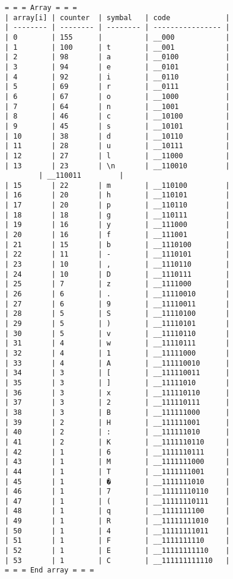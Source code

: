 \begin{lstlisting}[language=Out,]
= = = Array = = =
| array[i] | counter  | symbal   | code             |
| -------- | -------- | -------- | ---------------- |
| 0        | 155      |          | __000            |
| 1        | 100      | t        | __001            |
| 2        | 98       | a        | __0100           |
| 3        | 94       | e        | __0101           |
| 4        | 92       | i        | __0110           |
| 5        | 69       | r        | __0111           |
| 6        | 67       | o        | __1000           |
| 7        | 64       | n        | __1001           |
| 8        | 46       | c        | __10100          |
| 9        | 45       | s        | __10101          |
| 10       | 38       | d        | __10110          |
| 11       | 28       | u        | __10111          |
| 12       | 27       | l        | __11000          |
| 13       | 23       | \n       | __110010         |
        | __110011         |
| 15       | 22       | m        | __110100         |
| 16       | 20       | h        | __110101         |
| 17       | 20       | p        | __110110         |
| 18       | 18       | g        | __110111         |
| 19       | 16       | y        | __111000         |
| 20       | 16       | f        | __111001         |
| 21       | 15       | b        | __1110100        |
| 22       | 11       | -        | __1110101        |
| 23       | 10       | ,        | __1110110        |
| 24       | 10       | D        | __1110111        |
| 25       | 7        | z        | __1111000        |
| 26       | 6        | .        | __11110010       |
| 27       | 6        | 9        | __11110011       |
| 28       | 5        | S        | __11110100       |
| 29       | 5        | )        | __11110101       |
| 30       | 5        | v        | __11110110       |
| 31       | 4        | w        | __11110111       |
| 32       | 4        | 1        | __11111000       |
| 33       | 4        | A        | __111110010      |
| 34       | 3        | [        | __111110011      |
| 35       | 3        | ]        | __11111010       |
| 36       | 3        | x        | __111110110      |
| 37       | 3        | 2        | __111110111      |
| 38       | 3        | B        | __111111000      |
| 39       | 2        | H        | __111111001      |
| 40       | 2        | :        | __111111010      |
| 41       | 2        | K        | __1111110110     |
| 42       | 1        | 6        | __1111110111     |
| 43       | 1        | M        | __1111111000     |
| 44       | 1        | T        | __1111111001     |
| 45       | 1        | �        | __1111111010     |
| 46       | 1        | 7        | __11111110110    |
| 47       | 1        | (        | __11111110111    |
| 48       | 1        | q        | __1111111100     |
| 49       | 1        | R        | __11111111010    |
| 50       | 1        | 4        | __11111111011    |
| 51       | 1        | F        | __1111111110     |
| 52       | 1        | E        | __11111111110    |
| 53       | 1        | C        | __111111111110   |
= = = End array = = =
\end{lstlisting}
